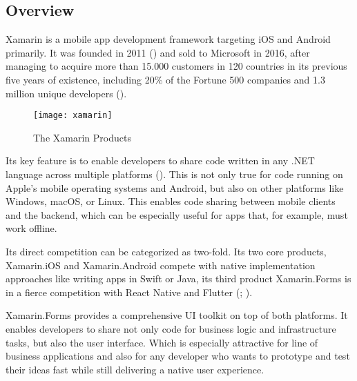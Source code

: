\subsection{Overview}

Xamarin is a mobile app development framework targeting iOS and Android primarily. It was founded in 2011 (\cite{de_icaza_announcing_2011}) and sold to Microsoft in 2016, after managing to acquire more than 15.000 customers in 120 countries in its previous five years of existence, including 20\% of the Fortune 500 companies and 1.3 million unique developers (\cite{guthrie_microsoft_2016}).

\begin{figure}[H]
\centering
\caption{The Xamarin Products}
\label{fig:chasm}
\texttt{[image: xamarin]}
\end{figure}

Its key feature is to enable developers to share code written in any .NET language across multiple platforms (\cite[6]{petzold_creating_2016}). This is not only true for code running on Apple's mobile operating systems and Android, but also on other platforms like Windows, macOS, or Linux. This enables code sharing between mobile clients and the backend, which can be especially useful for apps that, for example, must work offline. 

Its direct competition can be categorized as two-fold. Its two core products, Xamarin.iOS and Xamarin.Android compete with native implementation approaches like writing apps in Swift or Java, its third product Xamarin.Forms is in a fierce competition with React Native and Flutter (\cite[9]{kuitunen_cross-platform_2019}; \cite[9]{fayzullaev_native-like_2018}).

Xamarin.Forms provides a comprehensive UI toolkit on top of both platforms. It enables developers to share not only code for business logic and infrastructure tasks, but also the user interface. Which is especially attractive for line of business applications and also for any developer who wants to prototype and test their ideas fast while still delivering a native user experience.
